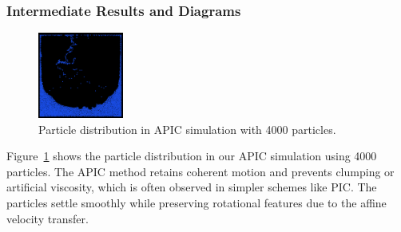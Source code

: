 \subsubsection{Intermediate Results and Diagrams}
\begin{figure}[h]
    \centering
    \includegraphics[width=0.25\textwidth]{figures/apic4000.png}
    \caption{Particle distribution in APIC simulation with 4000 particles. }
    \label{fig:apic4000}
\end{figure}

Figure~\ref{fig:apic4000} shows the particle distribution in our APIC simulation using 4000 particles. The APIC method retains coherent motion and prevents clumping or artificial viscosity, which is often observed in simpler schemes like PIC. The particles settle smoothly while preserving rotational features due to the affine velocity transfer.